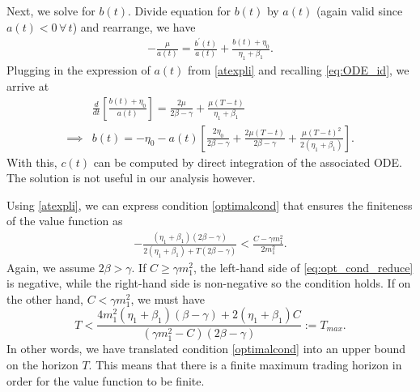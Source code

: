 \documentclass[12pt, letterpaper]{article}
\numberwithin{equation}{section}
\numberwithin{theorem}{section}
\begin{document}
Next, we solve for $b(t)$. Divide equation for $b(t)$ by $a(t)$ (again valid since $a(t)<0\,\forall\, t$) and rearrange, we have
\begin{equation}
\begin{aligned}
-\frac{\mu}{a(t)}=\frac{b^\prime(t)}{a(t)}+\frac{b(t)+\eta_0}{\eta_1+\beta_1}.
\end{aligned}
\end{equation}
Plugging in the expression of  $a(t)$ from \eqref{atexpli} and recalling  \eqref{eq:ODE_id}, we arrive at 
\begin{equation}
\begin{aligned}
&\frac{d}{dt}\left[\frac{b(t)+\eta_0}{a(t)}\right]=\frac{2\mu}{2\beta-\gamma}+\frac{\mu(T-t)}{\eta_1+\beta_1}\\
\implies&b(t)=-\eta_0-a(t)\left[\frac{2\eta_0}{2\beta-\gamma}+\frac{2\mu(T-t)}{2\beta-\gamma}+\frac{\mu(T-t)^2}{2(\eta_1+\beta_1)}\right].
\end{aligned}
\end{equation}
 With this,  $c(t)$ can be computed  by direct integration of the associated ODE. The solution is not useful in our analysis however.




Using \eqref{atexpli}, we can express condition \eqref{optimalcond}  that ensures the finiteness of the value function as
\begin{equation}\label{eq:opt_cond_reduce}
\begin{aligned}
-\frac{\left(\eta_1+\beta_1\right)\left(2\beta-\gamma\right)}{2\left(\eta_1+\beta_1\right)+T\left(2\beta-\gamma\right)}<\frac{C-\gamma m_1^2}{2m_1^2}.
\end{aligned}
\end{equation}
Again, we assume $2\beta>\gamma$. If $C\ge\gamma m_1^2$, the left-hand side of \eqref{eq:opt_cond_reduce} is negative, while the right-hand side is non-negative so the condition holds. If on the other hand, $C<\gamma m_1^2$, we must have
\begin{equation}
T<\frac{4m_1^2(\eta_1+\beta_1)(\beta-\gamma)+2(\eta_1+\beta_1)C}{(\gamma m_1^2-C)(2\beta-\gamma)}:=T_{max}.\label{condition11}
\end{equation}
In other words,  we have translated condition \eqref{optimalcond} into   an upper bound on the horizon $T$.  This means that there is a finite maximum trading horizon in order  for the value function to be finite.
\end{document}

